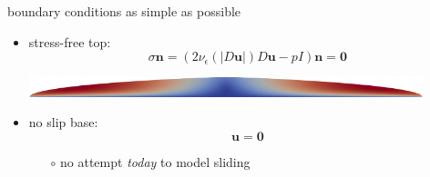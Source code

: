 \documentclass[10pt,hyperref,dvipsnames]{beamer}
\newcommand{\bn}{\mathbf{n}}
\newcommand{\bu}{\mathbf{u}}
\newcommand{\bzero}{\mathbf{0}}
\newcommand{\eps}{\epsilon}
\begin{document}
\begin{frame}{boundary conditions as simple as possible}

\begin{itemize}
\item stress-free top:
\begin{equation*}
\sigma \bn = \left(2 \nu_\eps(|D\bu|) D\bu - pI\right) \bn = \bzero
\end{equation*}

\bigskip
\includegraphics[width=0.9\textwidth]{figs/speed.png}

\bigskip
\item no slip base:
\begin{equation*}
\bu = \bzero
\end{equation*}
    \begin{itemize}
    \item[$\circ$] no attempt \emph{today} to model sliding
    \end{itemize}
\end{itemize}
\end{frame}
\end{document}
